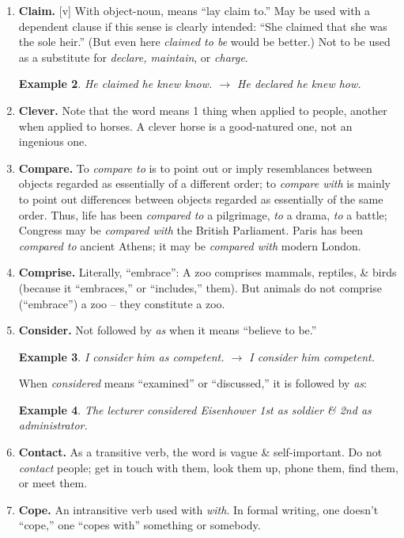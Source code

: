 \documentclass[oneside]{book}
\numberwithin{equation}{section}
\newtheorem{example}{Example}[chapter]
\begin{document}
\begin{enumerate}
	\begin{example}
		acts of a hostile character $\to$ hostile acts
	\end{example}
	\item \textbf{Claim.} [v] With object-noun, means ``lay claim to.'' May be used with a dependent clause if this sense is clearly intended: ``She claimed that she was the sole heir.'' (But even here \textit{claimed to be} would be better.) Not to be used as a substitute for \textit{declare, maintain}, or \textit{charge}.
	
	\begin{example}
		He claimed he knew know. $\to$ He declared he knew how.
	\end{example}
	\item \textbf{Clever.} Note that the word means 1 thing when applied to people, another when applied to horses. A clever horse is a good-natured one, not an ingenious one.
	\item \textbf{Compare.} To \textit{compare to} is to point out or imply resemblances between objects regarded as essentially of a different order; to \textit{compare with} is mainly to point out differences between objects regarded as essentially of the same order. Thus, life has been \textit{compared to} a pilgrimage, \textit{to} a drama, \textit{to} a battle; Congress may be \textit{compared with} the British Parliament. Paris has been \textit{compared to} ancient Athens; it may be \textit{compared with} modern London.
	\item \textbf{Comprise.} Literally, ``embrace'': A zoo comprises mammals, reptiles, \& birds (because it ``embraces,'' or ``includes,'' them). But animals do not comprise (``embrace'') a zoo -- they constitute a zoo.
	\item \textbf{Consider.} Not followed by \textit{as} when it means ``believe to be.''
	
	\begin{example}
		I consider him as competent. $\to$ I consider him competent.
	\end{example}
	When \textit{considered} means ``examined'' or ``discussed,'' it is followed by \textit{as}:
	\begin{example}
		The lecturer considered Eisenhower 1st as soldier \& 2nd as administrator.
	\end{example}
	\item \textbf{Contact.} As a transitive verb, the word is vague \& self-important. Do not \textit{contact} people; get in touch with them, look them up, phone them, find them, or meet them.
	\item \textbf{Cope.} An intransitive verb used with \textit{with}. In formal writing, one doesn't ``cope,'' one ``copes with'' something or somebody.
	

\end{enumerate}
\end{document}
